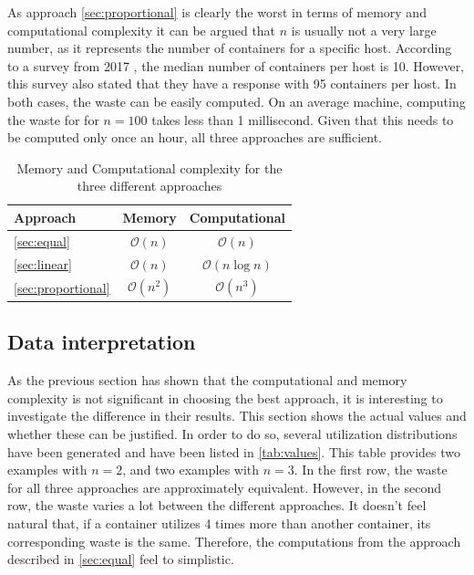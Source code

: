 \noindent
As approach \ref{sec:proportional} is clearly the worst in terms of memory and computational complexity it can be argued that $n$ is usually not a very large number, as it represents the number of containers for a specific host. According to a survey from 2017 \cite{docker_report}, the median number of containers per host is 10. However, this survey also stated that they have a response with 95 containers per host. In both cases, the waste can be easily computed. On an average machine, computing the waste for for $n = 100$ takes less than 1 millisecond. Given that this needs to be computed only once an hour, all three approaches are sufficient.

\begin{table}[ht]
    \centering
    \begin{tabular}{l|c|c}
        \textbf{Approach} & \textbf{Memory} & \textbf{Computational} \\ \hline
        \ref{sec:equal} & $\mathcal{O}(n)$ & $\mathcal{O}(n)$ \\
        \ref{sec:linear} & $\mathcal{O}(n)$ & $\mathcal{O}(n \log n)$ \\
        \ref{sec:proportional} & $\mathcal{O}(n^2)$ & $\mathcal{O}(n^3)$ \\
    \end{tabular}
    \caption{Memory and Computational complexity for the three different approaches}
    \label{tab:complexity}
\end{table}

\subsection{Data interpretation} \label{sec:data}
As the previous section has shown that the computational and memory complexity is not significant in choosing the best approach, it is interesting to investigate the difference in their results. This section shows the actual values and whether these can be justified. In order to do so, several utilization distributions have been generated and have been listed in \autoref{tab:values}. This table provides two examples with $n = 2$, and two examples with $n = 3$. In the first row, the waste for all three approaches are approximately equivalent. However, in the second row, the waste varies a lot between the different approaches. It doesn't feel natural that, if a container utilizes 4 times more than another container, its corresponding waste is the same. Therefore, the computations from the approach described in \autoref{sec:equal} feel to simplistic.\\

